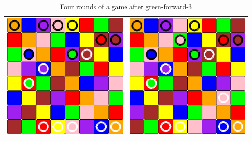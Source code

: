 \documentclass[a4paper, 11pt]{beamer}
\begin{document}
\begin{frame}
\begin{table}[htbp]
\begin{tabular}{c c}
    \includegraphics[scale = 0.11]{mathieu4_3.png} & \includegraphics[scale = 0.11]{mathieu4_4.png} \\
  \end{tabular}
  \caption{Four rounds of a game after green-forward-3}
 \end{table}
\end{frame}
\end{document}
